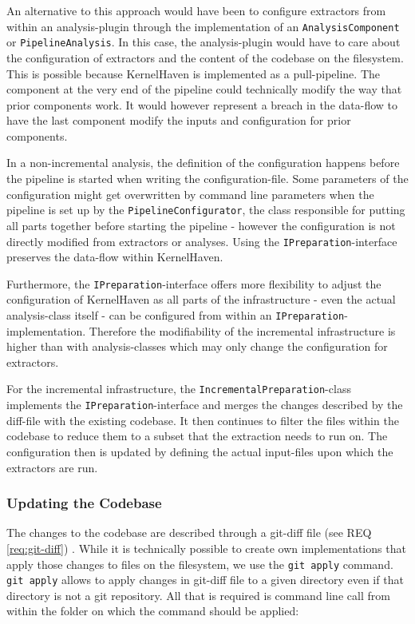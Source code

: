 \documentclass[a4paper]{article}
\begin{document}
An alternative to this approach would have been to configure extractors from within an analysis-plugin through the implementation of an \texttt{Analysis\-Component} or \texttt{PipelineAnalysis}. In this case, the analysis-plugin would have to care about the configuration of extractors and the content of the codebase on the filesystem. This is possible because KernelHaven is implemented as a pull-pipeline. The component at the very end of the pipeline could technically modify the way that prior components work. It would however represent a breach in the data-flow to have the last component modify the inputs and configuration for prior  components. 

In a non-incremental analysis, the definition of the configuration happens before the pipeline is started when writing the configuration-file. Some parameters of the configuration might get overwritten by command line parameters when the pipeline is set up by the \texttt{PipelineConfigurator}, the class responsible for putting all parts together before starting the pipeline - however the configuration is not directly modified from extractors or analyses. Using the \texttt{IPreparation}-interface preserves the data-flow within KernelHaven.

Furthermore, the \texttt{IPreparation}-interface offers more flexibility to adjust the configuration of KernelHaven as all parts of the infrastructure - even the actual analysis-class itself - can be configured from within an \texttt{IPreparation}-implementation. Therefore the modifiability of the incremental infrastructure is higher than with analysis-classes which may only change the configuration for extractors.

For the incremental infrastructure, the \texttt{Incremental\-Preparation}-class implements the \texttt{IPreparation}-interface and merges the changes described by the diff-file with the existing codebase. It then continues to filter the files within the codebase to reduce them to a subset that the extraction needs to run on. The configuration then is updated by defining the actual input-files upon which the extractors are run.

\subsubsection{Updating the Codebase}\label{git-apply}

The changes to the codebase are described through a git-diff file (see REQ \ref{req:git-diff}) . While it is technically possible to create own implementations that apply those changes to files on the filesystem, we use the \texttt{git apply} command. \texttt{git apply} allows to apply changes in git-diff file to a given directory even if that directory is not a git repository. All that is required is command line call from within the folder on which the command should be applied:
\end{document}
